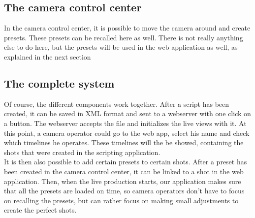 \subsection*{The camera control center}
In the camera control center, it is possible to move the camera around and create presets. These presets can be recalled here as well. There is not really anything else to do here, but the presets will be used in the web application as well, as explained in the next section

\subsection*{The complete system}
Of course, the different components work together. After a script has been created, it can be saved in XML format and sent to a webserver with one click on a button. The webserver accepts the file and initializes the live views with it. At this point, a camera operator could go to the web app, select his name and check which timelines he operates. These timelines will the be showed, containing the shots that were created in the scripting application.\\
It is then also possible to add certain presets to certain shots. After a preset has been created in the camera control center, it can be linked to a shot in the web application. Then, when the live production starts, our application makes sure that all the presets are loaded on time, so camera operators don't have to focus on recalling the presets, but can rather focus on making small adjustments to create the perfect shots.